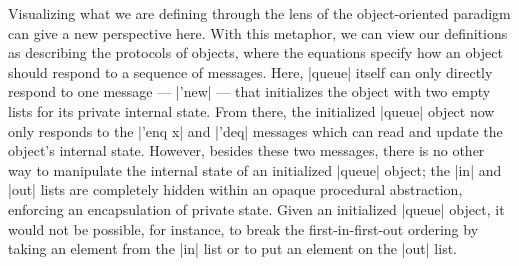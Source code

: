 Visualizing what we are defining through the lens of the object-oriented paradigm can give a new perspective here.
With this metaphor, we can view our definitions as describing the protocols of objects, where the equations specify how an object should respond to a sequence of messages.
Here, \scm|queue| itself can only directly respond to one message --- \scm|'new| --- that initializes the object with two empty lists for its private internal state.
From there, the initialized \scm|queue| object now only responds to the \scm|'enq x| and \scm|'deq| messages which can read and update the object's internal state.
However, besides these two messages, there is no other way to manipulate the internal state of an initialized \scm|queue| object;
the \scm|in| and \scm|out| lists are completely hidden within an opaque procedural abstraction, enforcing an encapsulation of private state.
Given an initialized \scm|queue| object, it would not be possible, for instance, to break the first-in-first-out ordering by taking an element from the \scm|in| list or to put an element on the \scm|out| list.

